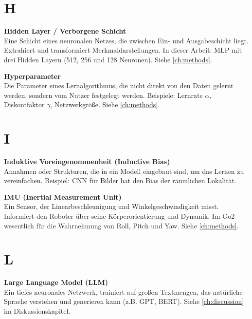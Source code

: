 \section*{H}

\vspace{0.3cm}
\noindent\textbf{Hidden Layer / Verborgene Schicht} \\
Eine Schicht eines neuronalen Netzes, die zwischen Ein- und Ausgabeschicht liegt. Extrahiert und transformiert Merkmaldarstellungen. In dieser Arbeit: MLP mit drei Hidden Layern (512, 256 und 128 Neuronen). Siehe \autoref{ch:methods}.

\vspace{0.5cm}
\noindent\textbf{Hyperparameter} \\
Die Parameter eines Lernalgorithmus, die nicht direkt von den Daten gelernt werden, sondern vom Nutzer festgelegt werden. Beispiele: Lernrate $\alpha$, Diskontfaktor $\gamma$, Netzwerkgröße. Siehe \autoref{ch:methods}.

\section*{I}

\vspace{0.3cm}
\noindent\textbf{Induktive Voreingenommenheit (Inductive Bias)} \\
Annahmen oder Strukturen, die in ein Modell eingebaut sind, um das Lernen zu vereinfachen. Beispiel: CNN für Bilder hat den Bias der räumlichen Lokalität.

\vspace{0.5cm}
\noindent\textbf{IMU (Inertial Measurement Unit)} \\
Ein Sensor, der Linearbeschleunigung und Winkelgeschwindigkeit misst. Informiert den Roboter über seine Körperorientierung und Dynamik. Im Go2 wesentlich für die Wahrnehmung von Roll, Pitch und Yaw. Siehe \autoref{ch:methods}.

\section*{L}

\vspace{0.3cm}
\noindent\textbf{Large Language Model (LLM)} \\
Ein tiefes neuronales Netzwerk, trainiert auf großen Textmengen, das natürliche Sprache verstehen und generieren kann (z.B. GPT, BERT). Siehe \autoref{ch:discussion} im Diskussionskapitel.

